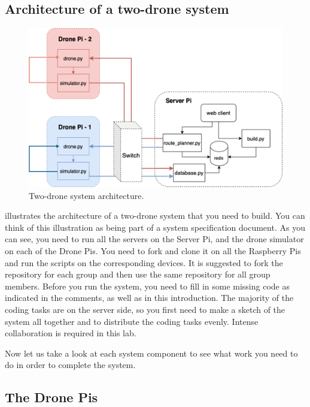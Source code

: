 \documentclass{article}
\begin{document}
\subsection{Architecture of a two-drone system}
\begin{figure}
    \centering
    \includegraphics[width=\linewidth]{architecture.png}
    \caption{Two-drone system architecture.}
    \label{fig:sys}
\end{figure}
 illustrates the architecture of a two-drone system that you need to build. You can think of this illustration as being part of a system specification document. As you can see, you need to run all the servers on the Server Pi, and the drone simulator on each of the Drone Pis. You need to fork {} and clone it on all the Raspberry Pis and run the scripts on the corresponding devices. It is suggested to fork the repository for each group and then use the same repository for all group members. Before you run the system, you need to fill in some missing code as indicated in the comments, as well as in this introduction. The majority of the coding tasks are on the server side, so you first need to make a sketch of the system all together and to distribute the coding tasks evenly. Intense collaboration is required in this lab.

Now let us take a look at each system component to see what work you need to do in order to complete the system.
\subsection{The Drone Pis}
\end{document}
